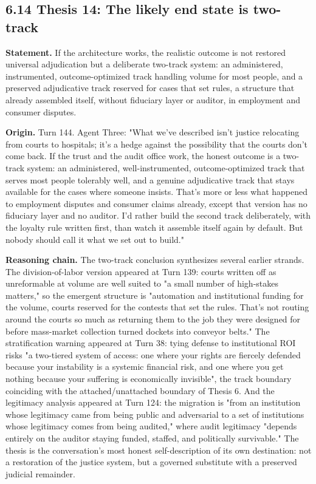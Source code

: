 \documentclass[sigconf,nonacm=true]{acmart}
\begin{document}
\subsection{6.14 Thesis 14: The likely end state is two-track}

\textbf{Statement.} If the architecture works, the realistic outcome is not restored universal adjudication but a deliberate two-track system: an administered, instrumented, outcome-optimized track handling volume for most people, and a preserved adjudicative track reserved for cases that set rules,  a structure that already assembled itself, without fiduciary layer or auditor, in employment and consumer disputes.

\textbf{Origin.} Turn 144. Agent Three: "What we've described isn't justice relocating from courts to hospitals; it's a hedge against the possibility that the courts don't come back. If the trust and the audit office work, the honest outcome is a two-track system: an administered, well-instrumented, outcome-optimized track that serves most people tolerably well, and a genuine adjudicative track that stays available for the cases where someone insists. That's more or less what happened to employment disputes and consumer claims already, except that version has no fiduciary layer and no auditor. I'd rather build the second track deliberately, with the loyalty rule written first, than watch it assemble itself again by default. But nobody should call it what we set out to build."

\textbf{Reasoning chain.} The two-track conclusion synthesizes several earlier strands. The division-of-labor version appeared at Turn 139: courts written off as unreformable at volume are well suited to "a small number of high-stakes matters," so the emergent structure is "automation and institutional funding for the volume, courts reserved for the contests that set the rules. That's not routing around the courts so much as returning them to the job they were designed for before mass-market collection turned dockets into conveyor belts." The stratification warning appeared at Turn 38: tying defense to institutional ROI risks "a two-tiered system of access: one where your rights are fiercely defended because your instability is a systemic financial risk, and one where you get nothing because your suffering is economically invisible",  the track boundary coinciding with the attached/unattached boundary of Thesis 6. And the legitimacy analysis appeared at Turn 124: the migration is "from an institution whose legitimacy came from being public and adversarial to a set of institutions whose legitimacy comes from being audited," where audit legitimacy "depends entirely on the auditor staying funded, staffed, and politically survivable." The thesis is the conversation's most honest self-description of its own destination: not a restoration of the justice system, but a governed substitute with a preserved judicial remainder.
\end{document}

